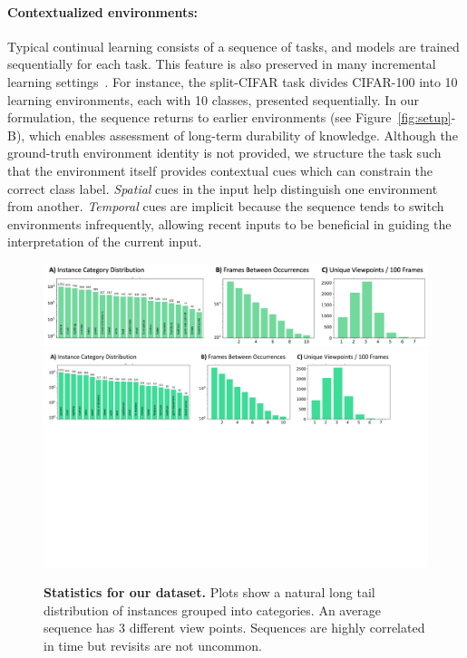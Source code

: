 \paragraph{Contextualized environments:}
Typical continual learning consists of a sequence of tasks, and models are trained sequentially for
each task. This feature is also preserved in many incremental learning settings~\citep{icarl}. For
instance, the split-CIFAR task divides CIFAR-100 into 10 learning environments, each with 10
classes, presented sequentially. In our formulation, the sequence returns to earlier environments
(see Figure~\ref{fig:setup}-B), which enables assessment of long-term durability of knowledge.
Although the ground-truth environment identity is not provided, we structure the task such that the
environment itself provides contextual cues which can constrain the correct class label.
\emph{Spatial} cues in the input help distinguish one environment from another. \emph{Temporal} cues
are implicit because the sequence tends to switch environments infrequently, allowing recent inputs
to be beneficial in guiding the interpretation of the current input.

\begin{figure}[t]
\centering
\vspace{-0.5in}
\iflatexml
\includegraphics[width=6\textwidth]{figures/condensedv2.png}
\else
\includegraphics[width=\textwidth,trim={0cm 12.5cm 2.5cm 0cm},clip]{figures/condensedv2.pdf}
\fi
\vspace{-.25in}
\caption{\textbf{Statistics for our \ourroom{} dataset.}
Plots show a natural long tail distribution of instances grouped into categories. An
average sequence has 3 different view points. Sequences are highly correlated in time but revisits
are not uncommon. }
\label{fig:dataset_distribution}
\vspace{-0.15in}
\end{figure}


